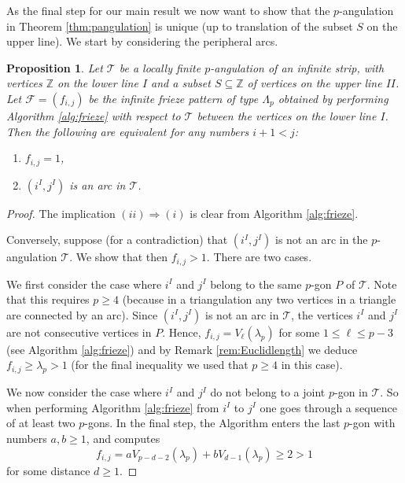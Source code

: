 \documentclass[11pt,a4paper]{amsart}
\newtheorem{Proposition}[Lemma]{Proposition}
\theoremstyle{definition}
\numberwithin{equation}{section}
\begin{document}
As the final step for our main result we now want to show that the $p$-angulation in Theorem \ref{thm:pangulation}
is unique (up to translation of the subset $S$ on the upper line). We start by considering the peripheral arcs. 


\begin{Proposition} \label{prop:1inF}
Let $\mathcal{T}$ be a locally finite $p$-angulation of an infinite strip, with vertices $\mathbb{Z}$ on the lower line
$I$
and a subset $S\subseteq \mathbb{Z}$ of vertices on the upper line $II$. 
Let $\mathcal{F}=(f_{i,j})$ be the infinite frieze pattern of type $\Lambda_p$ obtained by performing 
Algorithm \ref{alg:frieze} with respect to $\mathcal{T}$ between the vertices on the lower line $I$. 
Then the following are equivalent for any numbers $i+1<j$:
\begin{enumerate}
\item[{(i)}] $f_{i,j}=1$,
\item[{(ii)}] $(i^I,j^I)$ is an arc in $\mathcal{T}$. 
\end{enumerate}
\end{Proposition}


\begin{proof}
The implication $(ii)\Rightarrow (i)$ is clear from Algorithm \ref{alg:frieze}. 

Conversely, suppose (for a contradiction) that $(i^I,j^I)$ is not an arc in the $p$-angulation $\mathcal{T}$.
We show that then $f_{i,j}>1$. There are two cases. 

We first consider the case where $i^I$ and $j^I$ belong to the same $p$-gon $P$ of $\mathcal{T}$. 
Note that this requires $p\ge 4$ (because in a triangulation any two vertices in a triangle are connected by an arc). 
Since $(i^I,j^I)$ is not an arc in $\mathcal{T}$, the vertices $i^I$ and $j^I$ are not consecutive vertices 
in $P$. Hence, $f_{i,j}=V_{\ell}(\lambda_p)$ for some $1\le \ell\le p-3$ (see Algorithm \ref{alg:frieze})
and by Remark 
\ref{rem:Euclidlength} we deduce $f_{i,j}\ge \lambda_p>1$ (for the final inequality we used that $p\ge 4$
in this case).

We now consider the case where $i^I$ and $j^I$ do not belong to a joint $p$-gon in $\mathcal{T}$. 
So when performing Algorithm \ref{alg:frieze} from $i^I$ to $j^I$ one goes through a sequence of at least 
two $p$-gons. In the final step, the Algorithm enters the last $p$-gon with numbers $a,b\ge 1$, and computes
$$f_{i,j} = a V_{p-d-2}(\lambda_p) + b V_{d-1}(\lambda_p) \ge 2>1
$$
for some distance $d\ge 1$. 
\end{proof}
\end{document}
